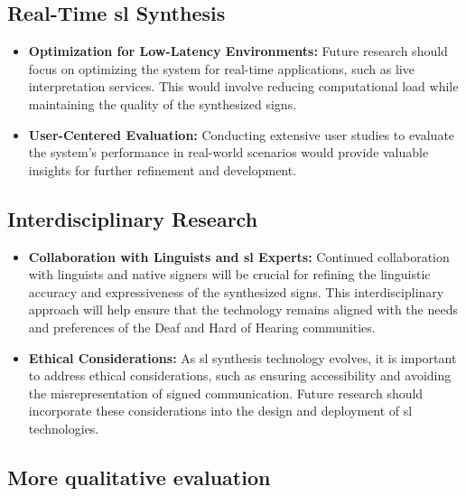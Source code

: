 \documentclass[../../main.tex]{subfiles}
\begin{document}
\subsection{Real-Time \gls{sl} Synthesis}
\label{ch:conclusion:future:realtime}

\begin{itemize}
    \item \textbf{Optimization for Low-Latency Environments:} Future research should focus on optimizing the system for real-time applications, such as live interpretation services. This would involve reducing computational load while maintaining the quality of the synthesized signs.
    
    \item \textbf{User-Centered Evaluation:} Conducting extensive user studies to evaluate the system’s performance in real-world scenarios would provide valuable insights for further refinement and development.
\end{itemize}

\subsection{Interdisciplinary Research}
\label{ch:conclusion:future:interdisciplinary}

\begin{itemize}
    \item \textbf{Collaboration with Linguists and \gls{sl} Experts:} Continued collaboration with linguists and native signers will be crucial for refining the linguistic accuracy and expressiveness of the synthesized signs. This interdisciplinary approach will help ensure that the technology remains aligned with the needs and preferences of the Deaf and Hard of Hearing communities.
    
    \item \textbf{Ethical Considerations:} As \gls{sl} synthesis technology evolves, it is important to address ethical considerations, such as ensuring accessibility and avoiding the misrepresentation of signed communication. Future research should incorporate these considerations into the design and deployment of \gls{sl} technologies.
\end{itemize}

\subsection{More qualitative evaluation}
\label{ch:conclusion:future:evaluation}
\end{document}
